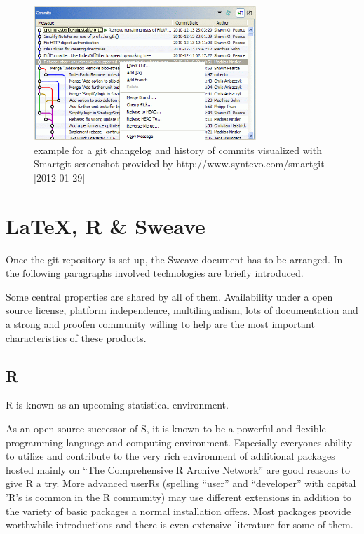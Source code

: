\documentclass{ifacconf}
\begin{document}
\begin{figure}[h]
\begin{center}
\includegraphics[width=8.4cm]{pics/Smartgit_graphical_Log.png}    %
\caption{example for a git changelog and history of commits visualized with Smartgit \newline 
screenshot provided by http://www.syntevo.com/smartgit [2012-01-29]} 
\label{fig:gitHistory}
\end{center}
\end{figure}

\section{\LaTeX, R \& Sweave}\label{sec:structure}

Once the git repository is set up, the Sweave document has to be arranged. 
In the following paragraphs involved technologies are briefly introduced.

Some central properties are shared by all of them. Availability under a open source license, 
platform independence, multilingualism, lots of documentation and a strong and proofen 
community willing to help are the most important characteristics of these products.


\subsection{R}
R \citep{R} is known as an upcoming statistical environment. 

As an open source successor of S, it is known to be a powerful and flexible programming language
and computing environment. Especially everyones ability to utilize and
contribute to the very rich environment of additional packages hosted 
mainly on “The Comprehensive R Archive Network” are good reasons to give R a try. 
More advanced userRs (spelling “user” and “developer” with capital
’R’s is common in the R community) may use different extensions in 
addition to the variety of basic packages a normal installation offers.
Most packages provide worthwhile introductions and there is even extensive literature
for some of them.
\end{document}
